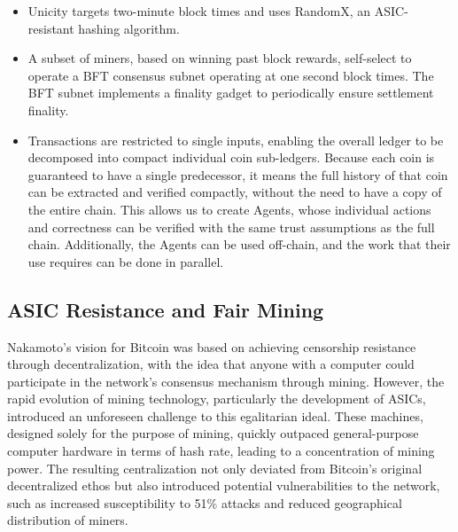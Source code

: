 \documentclass{article}
\begin{document}
\begin{itemize}
\setlength{\leftmargin}{1em}
 \item Unicity targets two-minute block times and uses RandomX, an ASIC-resistant hashing algorithm. 
 \item A subset of miners, based on winning past block rewards, self-select to operate a BFT consensus subnet operating at one second block times. The BFT subnet implements a finality gadget to periodically ensure settlement finality.
 \item Transactions are restricted to single inputs, enabling the overall ledger to be decomposed into compact individual coin sub-ledgers.  Because each coin is guaranteed to have a single predecessor, it means the full history of that coin can be extracted and verified compactly, without the need to have a copy of the entire chain.  This allows us to create Agents, whose individual actions and correctness can be verified with the same trust assumptions as the full chain.  Additionally, the Agents can be used off-chain, and the work that their use requires can be done in parallel.
\end{itemize}




\subsection*{ASIC Resistance and Fair Mining}

Nakamoto's vision for Bitcoin was based on achieving censorship resistance through decentralization, with the idea that anyone with a computer could participate in the network's consensus mechanism through mining. However, the rapid evolution of mining technology, particularly the development of ASICs, introduced an unforeseen challenge to this egalitarian ideal. These machines, designed solely for the purpose of mining, quickly outpaced general-purpose computer hardware in terms of hash rate, leading to a concentration of mining power. The resulting centralization not only deviated from Bitcoin's original decentralized ethos but also introduced potential vulnerabilities to the network, such as increased susceptibility to 51\% attacks and reduced geographical distribution of miners. 
\end{document}
